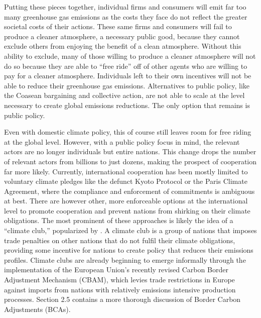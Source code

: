 Putting these pieces together, individual firms and consumers will emit far too many greenhouse gas emissions as the costs they face do not reflect the greater societal costs of their actions. These same firms and consumers will fail to produce a cleaner atmosphere, a necessary public good, because they cannot exclude others from enjoying the benefit of a clean atmosphere. Without this ability to exclude, many of those willing to produce a cleaner atmosphere will not do so because they are able to ``free ride'' off of other agents who are willing to pay for a cleaner atmosphere. Individuals left to their own incentives will not be able to reduce their greenhouse gas emissions. Alternatives to public policy, like the Coasean bargaining and collective action, are not able to scale at the level necessary to create global emissions reductions. The only option that remains is public policy. 

Even with domestic climate policy, this of course still leaves room for free riding at the global level. However, with a public policy focus in mind, the relevant actors are no longer individuals but entire nations. This change drops the number of relevant actors from billions to just dozens, making the prospect of cooperation far more likely. Currently, international cooperation has been mostly limited to voluntary climate pledges like the defunct Kyoto Protocol or the Paris Climate Agreement, where the compliance and enforcement of commitments is ambiguous at best. There are however other, more enforceable options at the international level to promote cooperation and prevent nations from shirking on their climate obligations. The most prominent of these approaches is likely the idea of a ``climate club,'' popularized by \cite{nordhaus2015climate}. A climate club is a group of nations that imposes trade penalties on other nations that do not fulfil their climate obligations, providing some incentive for nations to create policy that reduces their emissions profiles. Climate clubs are already beginning to emerge informally through the implementation of the European Union's recently revised Carbon Border Adjustment Mechanism (CBAM), which levies trade restrictions in Europe against imports from nations with relatively emissions intensive production processes. Section 2.5 contains a more thorough discussion of Border Carbon Adjustments (BCAs).










